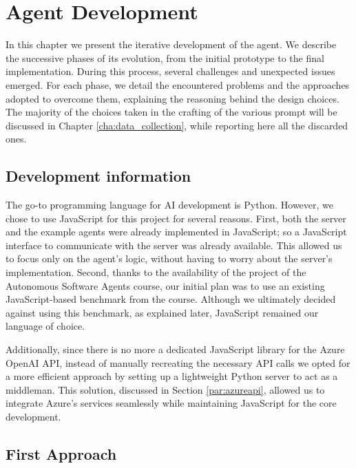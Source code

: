 \chapter{Agent Development}
\label{cha:agent_development}

In this chapter we present the iterative development of the agent. We describe the
successive phases of its evolution, from the initial prototype to the final
implementation. During this process, several challenges and unexpected issues
emerged. For each phase, we detail the encountered problems and the approaches
adopted to overcome them, explaining the reasoning behind the design choices.
The majority of the choices taken in the crafting of the various prompt will be
discussed in Chapter \ref{cha:data_collection}, while reporting here all the discarded
ones.

\section{Development information}
\label{sec:development_information}

The go-to programming language for AI development is Python. However, we chose
to use JavaScript for this project for several reasons. First, both the server
and the example agents were already implemented in JavaScript; so a JavaScript interface
to communicate with the server was already available. This allowed us to focus
only on the agent's logic, without having to worry about the server's implementation.
Second, thanks to the availability of the project of the Autonomous Software Agents
course, our initial plan was to use an existing JavaScript-based benchmark from
the course. Although we ultimately decided against using this benchmark, as
explained later, JavaScript remained our language of choice.

Additionally, since there is no more a dedicated JavaScript library for the
Azure OpenAI API, instead of manually recreating the necessary API calls we opted
for a more efficient approach by setting up a lightweight Python server to act as
a middleman. This solution, discussed in Section \ref{par:azureapi}, allowed us
to integrate Azure's services seamlessly while maintaining JavaScript for the
core development.

\section{First Approach}
\label{sec:first_approach}

